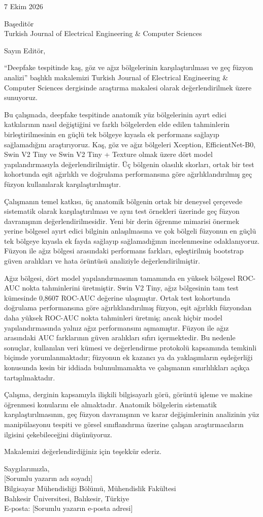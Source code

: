 \documentclass[11pt,a4paper]{article}
\begin{document}
7 Ekim 2026

Başeditör\\Turkish Journal of Electrical Engineering \& Computer Sciences

Sayın Editör,

“Deepfake tespitinde kaş, göz ve ağız bölgelerinin karşılaştırılması ve geç füzyon analizi” başlıklı makalemizi Turkish Journal of Electrical Engineering \& Computer Sciences dergisinde araştırma makalesi olarak değerlendirilmek üzere sunuyoruz.

Bu çalışmada, deepfake tespitinde anatomik yüz bölgelerinin ayırt edici katkılarının nasıl değiştiğini ve farklı bölgelerden elde edilen tahminlerin birleştirilmesinin en güçlü tek bölgeye kıyasla ek performans sağlayıp sağlamadığını araştırıyoruz. Kaş, göz ve ağız bölgeleri Xception, EfficientNet-B0, Swin V2 Tiny ve Swin V2 Tiny + Texture olmak üzere dört model yapılandırmasıyla değerlendirilmiştir. Üç bölgenin olasılık skorları, ortak bir test kohortunda eşit ağırlıklı ve doğrulama performansına göre ağırlıklandırılmış geç füzyon kullanılarak karşılaştırılmıştır.

Çalışmanın temel katkısı, üç anatomik bölgenin ortak bir deneysel çerçevede sistematik olarak karşılaştırılması ve aynı test örnekleri üzerinde geç füzyon davranışının değerlendirilmesidir. Yeni bir derin öğrenme mimarisi önermek yerine bölgesel ayırt edici bilginin anlaşılmasına ve çok bölgeli füzyonun en güçlü tek bölgeye kıyasla ek fayda sağlayıp sağlamadığının incelenmesine odaklanıyoruz. Füzyon ile ağız bölgesi arasındaki performans farkları, eşleştirilmiş bootstrap güven aralıkları ve hata örüntüsü analiziyle değerlendirilmiştir.

Ağız bölgesi, dört model yapılandırmasının tamamında en yüksek bölgesel ROC-AUC nokta tahminlerini üretmiştir. Swin V2 Tiny, ağız bölgesinin tam test kümesinde 0,8607 ROC-AUC değerine ulaşmıştır. Ortak test kohortunda doğrulama performansına göre ağırlıklandırılmış füzyon, eşit ağırlıklı füzyondan daha yüksek ROC-AUC nokta tahminleri üretmiş; ancak hiçbir model yapılandırmasında yalnız ağız performansını aşmamıştır. Füzyon ile ağız arasındaki AUC farklarının güven aralıkları sıfırı içermektedir. Bu nedenle sonuçlar, kullanılan veri kümesi ve değerlendirme protokolü kapsamında temkinli biçimde yorumlanmaktadır; füzyonun ek kazancı ya da yaklaşımların eşdeğerliği konusunda kesin bir iddiada bulunulmamakta ve çalışmanın sınırlılıkları açıkça tartışılmaktadır.

Çalışma, derginin kapsamıyla ilişkili bilgisayarlı görü, görüntü işleme ve makine öğrenmesi konularını ele almaktadır. Anatomik bölgelerin sistematik karşılaştırılmasının, geç füzyon davranışının ve karar değişimlerinin analizinin yüz manipülasyonu tespiti ve görsel sınıflandırma üzerine çalışan araştırmacıların ilgisini çekebileceğini düşünüyoruz.

Makalemizi değerlendirdiğiniz için teşekkür ederiz.

Saygılarımızla,\\{} [Sorumlu yazarın adı soyadı]\\{} Bilgisayar Mühendisliği Bölümü, Mühendislik Fakültesi\\{} Balıkesir Üniversitesi, Balıkesir, Türkiye\\{} E-posta: [Sorumlu yazarın e-posta adresi]
\end{document}
